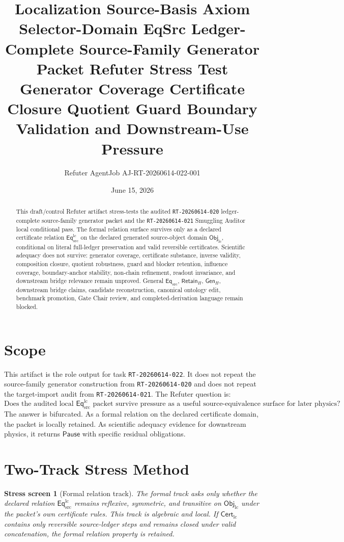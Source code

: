 \documentclass[11pt]{article}
\title{\textbf{Localization Source-Basis Axiom Selector-Domain EqSrc Ledger-Complete Source-Family Generator Packet Refuter Stress Test}\\[0.35em]
\large Generator Coverage Certificate Closure Quotient Guard Boundary Validation and Downstream-Use Pressure}
\author{Refuter AgentJob AJ-RT-20260614-022-001}
\date{June 15, 2026}
\newcommand{\EqSrc}{\mathsf{Eq}_{\mathrm{src}}}
\newcommand{\EqLC}{\mathsf{Eq}_{\mathrm{src}}^{\mathrm{lc}}}
\newcommand{\ObjLC}{\mathsf{Obj}_{\mathrm{lc}}}
\newcommand{\CertLC}{\mathsf{Cert}_{\mathrm{lc}}}
\newcommand{\RetainH}{\mathsf{Retain}_{H}}
\newcommand{\GenH}{\mathsf{Gen}_{H}}
\newcommand{\Pause}{\mathsf{Pause}}
\newtheorem{stressscreen}{Stress screen}
\begin{document}
\maketitle

\begin{abstract}
This draft/control Refuter artifact stress-tests the audited
\texttt{RT-20260614-020} ledger-complete source-family generator packet
and the \texttt{RT-20260614-021} Smuggling Auditor local conditional
pass. The formal relation surface survives only as a declared
certificate relation \(\EqLC\) on the declared generated source-object
domain \(\ObjLC\), conditional on literal full-ledger preservation and
valid reversible certificates. Scientific adequacy does not survive:
generator coverage, certificate substance, inverse validity, composition
closure, quotient robustness, guard and blocker retention, influence
coverage, boundary-anchor stability, non-chain refinement, readout
invariance, and downstream bridge relevance remain unproved. General
\(\EqSrc\), \(\RetainH\), \(\GenH\), downstream bridge claims,
candidate reconstruction, canonical ontology edit, benchmark promotion,
Gate Chair review, and completed-derivation language remain blocked.
\end{abstract}

\section{Scope}

This artifact is the role output for task \texttt{RT-20260614-022}. It
does not repeat the source-family generator construction from
\texttt{RT-20260614-020} and does not repeat the target-import audit
from \texttt{RT-20260614-021}. The Refuter question is:
\[
    \text{Does the audited local }\EqLC\text{ packet survive pressure as
    a useful source-equivalence surface for later physics?}
\]
The answer is bifurcated. As a formal relation on the declared
certificate domain, the packet is locally retained. As scientific
adequacy evidence for downstream physics, it returns \(\Pause\) with
specific residual obligations.

\section{Two-Track Stress Method}

\begin{stressscreen}[Formal relation track]
The formal track asks only whether the declared relation \(\EqLC\)
remains reflexive, symmetric, and transitive on \(\ObjLC\) under the
packet's own certificate rules. This track is algebraic and local.
If \(\CertLC\) contains only reversible source-ledger steps and remains
closed under valid concatenation, the formal relation property is
retained.
\end{stressscreen}
\end{document}
